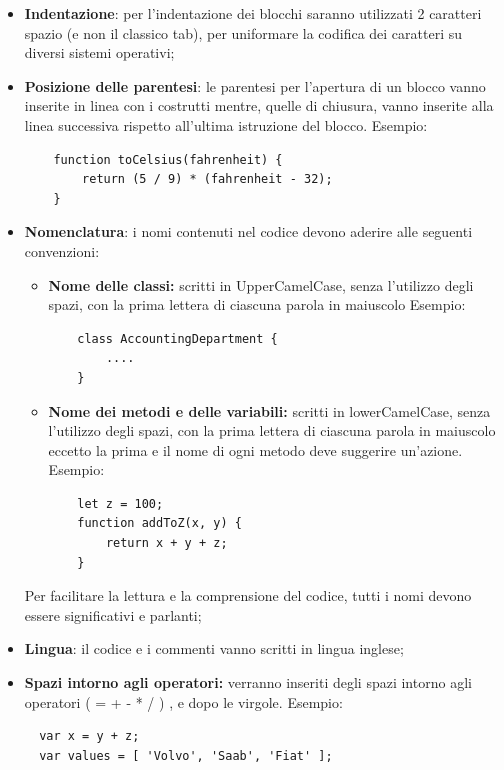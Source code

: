 \begin{itemize}
  \item \textbf{Indentazione}: per l'indentazione dei blocchi saranno utilizzati 2 caratteri spazio (e non il classico tab), per uniformare la codifica dei caratteri su diversi sistemi operativi;
  \item \textbf{Posizione delle parentesi}: le parentesi per l'apertura di un blocco vanno inserite in linea con i costrutti mentre, quelle di chiusura, vanno inserite alla linea successiva rispetto all'ultima istruzione del blocco.
  Esempio:
  \begin{lstlisting}
  	function toCelsius(fahrenheit) {
  		return (5 / 9) * (fahrenheit - 32);
  	}
  \end{lstlisting}
  \item \textbf{Nomenclatura}: i nomi contenuti nel codice devono aderire alle seguenti convenzioni:
  \begin{itemize}
  	\item \textbf{Nome delle classi:} scritti in UpperCamelCase, senza l'utilizzo degli spazi, con la prima lettera di ciascuna parola in maiuscolo Esempio:
  	\begin{lstlisting}
  	class AccountingDepartment {
  		....
  	}
  	\end{lstlisting}
  	\item \textbf{Nome dei metodi e delle variabili:} scritti in lowerCamelCase, senza l'utilizzo degli spazi, con la prima lettera di ciascuna parola in maiuscolo eccetto la prima e il nome di ogni metodo deve suggerire un'azione. Esempio:
  	\begin{lstlisting}
  	let z = 100;
  	function addToZ(x, y) {
  		return x + y + z;
  	}
  	\end{lstlisting}
  \end{itemize}
  Per facilitare la lettura e la comprensione del codice, tutti i nomi devono essere significativi e parlanti;
  \item \textbf{Lingua}: il codice e i commenti vanno scritti in lingua inglese;
  \item \textbf{Spazi intorno agli operatori:} verranno inseriti degli spazi intorno agli operatori ( = + - * / ) , e dopo le virgole.
  Esempio:
  \begin{lstlisting}
  var x = y + z;
  var values = [ 'Volvo', 'Saab', 'Fiat' ];
  \end{lstlisting}

\end{itemize}

